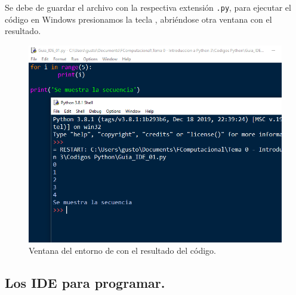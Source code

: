 Se debe de guardar el archivo con la respectiva extensión \texttt{.py}, para ejecutar el código en Windows presionamos la tecla , abriéndose otra ventana con el resultado.
\begin{figure}[H]
    \centering
    \includegraphics[scale=0.7]{Imagenes/Guia_IDE_08.png}
    \caption{Ventana del entorno de \python{} con el resultado del código.}
\end{figure}

\subsection{Los IDE para programar.}

